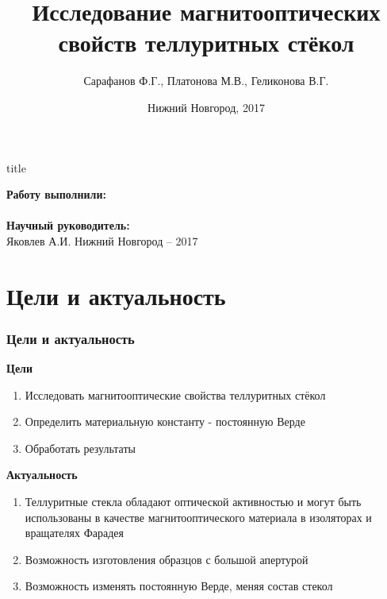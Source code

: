 \documentclass[10pt,pdf,hyperref={unicode}, dvipsnames]{beamer}
\begin{document}
  

\title[Магнитооптическая активность теллуритных стёкол]{Исследование магнитооптических свойств теллуритных стёкол}
\author{Сарафанов Ф.Г., Платонова М.В., Геликонова В.Г. }
\date{Нижний Новгород, 2017}

\begin{frame}[plain]
	\centering
	\vspace{2cm}
	\begin{beamercolorbox}[sep=8pt,center]{title}
		\inserttitle
	\end{beamercolorbox}
	\vspace{0.5cm}
	\normalsize \textbf{Работу выполнили:}\\
	\large\insertauthor\\ 
	\vspace{0.5cm}
	\normalsize{\textbf{Научный руководитель:}\\}
	\large{Яковлев А.И.}
	\vfill
	\small{Нижний Новгород -- 2017}
\end{frame}
\section{Цели и актуальность}
\begin{frame}[t]
	\frametitle{Цели и актуальность}
	\textbf{Цели}\\
	\begin{enumerate}
		\item Исследовать магнитооптические свойства теллуритных стёкол
		\item Определить материальную константу - постоянную Верде
		\item Обработать результаты
	\end{enumerate}
	\textbf{Актуальность}\\
	\begin{enumerate}
		\item Теллуритные стекла обладают оптической активностью и могут быть использованы в качестве магнитооптического материала в изоляторах и вращателях Фарадея
		\item Возможность изготовления образцов с большой апертурой
		\item Возможность изменять постоянную Верде, меняя состав стекол
	\end{enumerate}
\end{frame}
\end{document}
